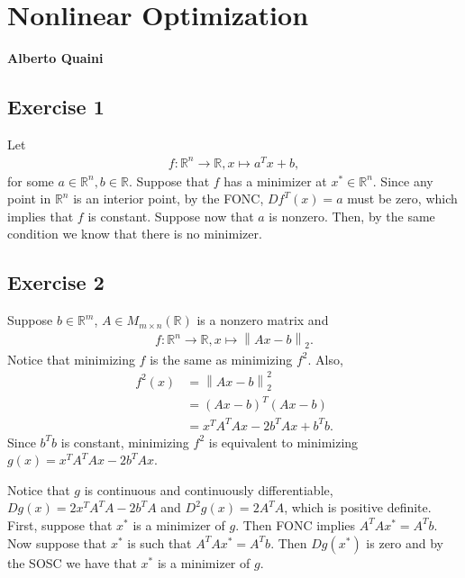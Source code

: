 \documentclass[11.5pt, letterpaper, bibtotoc,
    tablecaptionabove, figurecaptionabove]{article}
\newcommand{\norm}[1]{\left\lVert#1\right\rVert}
\begin{document}
\section*{Nonlinear Optimization}
\textbf{Alberto Quaini}

\subsection*{Exercise 1}
Let 
\begin{align*}
    f:\mathbb R^n\to\mathbb R, x\mapsto a^Tx+b,
\end{align*}
for some $a\in\mathbb R^n, b\in\mathbb R$.
Suppose that $f$ has a minimizer at $x^*\in\mathbb R^n$.
Since any point in $\mathbb R^n$ is an interior point,
by the FONC, $Df^T(x)=a$ must be zero,
which implies that $f$ is constant.
Suppose now that $a$ is nonzero.
Then, by the same condition we know that there is no minimizer.

\subsection*{Exercise 2}
Suppose $b\in\mathbb R^m$, $A\in M_{m\times n}(\mathbb R)$ is a nonzero matrix
and 
\begin{align*}
    f:\mathbb R^n\to\mathbb R, x\mapsto\norm{Ax-b}_2.
\end{align*}
Notice that minimizing $f$ is the same as minimizing $f^2$.
Also,
\begin{align*}
    f^2(x)&=\norm{Ax-b}_2^2\\
    &=(Ax-b)^T(Ax-b)\\
    &=x^TA^TAx-2b^TAx+b^Tb.
\end{align*}
Since $b^Tb$ is constant, minimizing $f^2$ 
is equivalent to minimizing $g(x)=x^TA^TAx-2b^TAx$.

Notice that $g$ is continuous and continuously differentiable, 
$Dg(x)=2x^TA^TA-2b^TA$ and $D^2g(x)=2A^TA$, which is positive definite.
First, suppose that $x^*$ is a minimizer of $g$.
Then FONC implies $A^TAx^*=A^Tb$.
Now suppose that $x^*$ is such that $A^TAx^*=A^Tb$.
Then $Dg(x^*)$ is zero and by the SOSC we have that $x^*$ is a minimizer of $g$.
\end{document}

